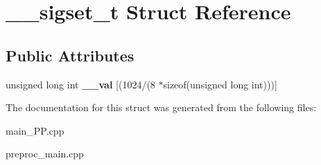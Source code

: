 \hypertarget{struct____sigset__t}{\section{\+\_\+\+\_\+sigset\+\_\+t Struct Reference}
\label{struct____sigset__t}
}
\subsection*{Public Attributes}
\begin{DoxyCompactItemize}
\item 
\hypertarget{struct____sigset__t_a0e131a0eaa4d6dfd7baa1da69b2b33de}{unsigned long int {\bfseries \+\_\+\+\_\+val} \mbox{[}(1024/(8 $\ast$sizeof(unsigned long int)))\mbox{]}}\label{struct____sigset__t_a0e131a0eaa4d6dfd7baa1da69b2b33de}

\end{DoxyCompactItemize}


The documentation for this struct was generated from the following files\+:\begin{DoxyCompactItemize}
\item 
main\+\_\+\+P\+P.\+cpp\item 
preproc\+\_\+main.\+cpp\end{DoxyCompactItemize}
